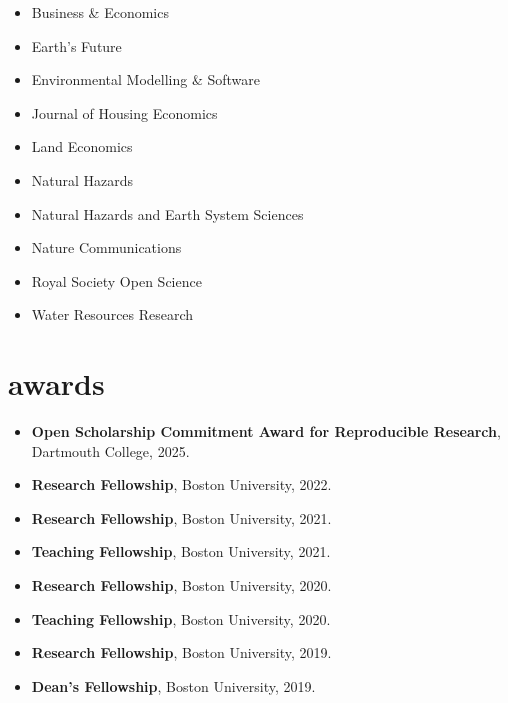 \documentclass[10pt,oneside]{article}
\begin{document}
\begin{itemize}[label={}]
  
    \item Business \& Economics
  
    \item Earth's Future
  
    \item Environmental Modelling \& Software
  
    \item Journal of Housing Economics
  
    \item Land Economics
  
    \item Natural Hazards
  
    \item Natural Hazards and Earth System Sciences
  
    \item Nature Communications
  
    \item Royal Society Open Science
  
    \item Water Resources Research
  
\end{itemize}


\section{awards}

\mbox{}\vspace{-\dimexpr\baselineskip\relax}

\begin{itemize}[label={}]
  
  \item \textbf{Open Scholarship Commitment Award for Reproducible Research}, Dartmouth College, 2025.
        
  \item \textbf{Research Fellowship}, Boston University, 2022.
        
  \item \textbf{Research Fellowship}, Boston University, 2021.
        
  \item \textbf{Teaching Fellowship}, Boston University, 2021.
        
  \item \textbf{Research Fellowship}, Boston University, 2020.
        
  \item \textbf{Teaching Fellowship}, Boston University, 2020.
        
  \item \textbf{Research Fellowship}, Boston University, 2019.
        
  \item \textbf{Dean's Fellowship}, Boston University, 2019.
        
\end{itemize}
\end{document}
